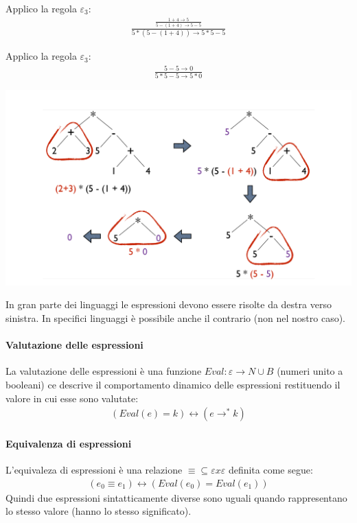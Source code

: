 \documentclass[a4paper, 10pt]{report}
\begin{document}
Applico la regola $\varepsilon_3$:
\begin{align*}
\frac{\frac{1+4 \rightarrow 5}{5-(1+4) \rightarrow 5 - 5}}{5*(5-(1+4)) \rightarrow 5*5-5}
\end{align*}

Applico la regola $\varepsilon_3$:
\begin{align*}
\frac{5 - 5 \rightarrow 0}{5*5-5 \rightarrow 5*0}
\end{align*}

\begin{center}
\includegraphics[scale=0.8]{esempio1.pdf}
\end{center}

\noindent In gran parte dei linguaggi le espressioni devono essere risolte da destra verso sinistra. In specifici linguaggi è possibile anche il contrario (non nel nostro caso).\\

\paragraph*{Valutazione delle espressioni} La valutazione delle espressioni è una funzione $Eval: \varepsilon \rightarrow N \cup B$ (numeri unito a booleani) ce descrive il comportamento dinamico delle espressioni restituendo il valore in cui esse sono valutate:
\begin{align*}
(Eval(e) = k) \longleftrightarrow (e \rightarrow^* k)
\end{align*}

\paragraph*{Equivalenza di espressioni} L'equivaleza di espressioni è una relazione $\equiv \subseteq \varepsilon x \varepsilon$ definita come segue:
\begin{align*}
(e_0 \equiv e_1) \longleftrightarrow (Eval(e_0) = Eval(e_1))
\end{align*}
Quindi due espressioni sintatticamente diverse sono uguali quando rappresentano lo stesso valore (hanno lo stesso significato).
\end{document}
